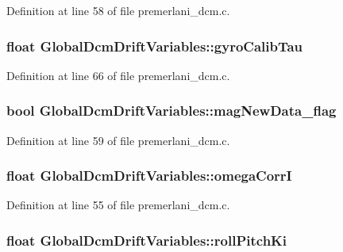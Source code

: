 \-Definition at line 58 of file premerlani\-\_\-dcm.\-c.

\hypertarget{struct_global_dcm_drift_variables_a3b2a14d2ee0eb630e1d8048391e1fdd4}{
\subsubsection[{gyro\-Calib\-Tau}]{\setlength{\rightskip}{0pt plus 5cm}float {\bf \-Global\-Dcm\-Drift\-Variables\-::gyro\-Calib\-Tau}}}\label{struct_global_dcm_drift_variables_a3b2a14d2ee0eb630e1d8048391e1fdd4}


\-Definition at line 66 of file premerlani\-\_\-dcm.\-c.

\hypertarget{struct_global_dcm_drift_variables_a225159950d82f32b3c5fe0d4014488cf}{
\subsubsection[{mag\-New\-Data\-\_\-flag}]{\setlength{\rightskip}{0pt plus 5cm}bool {\bf \-Global\-Dcm\-Drift\-Variables\-::mag\-New\-Data\-\_\-flag}}}\label{struct_global_dcm_drift_variables_a225159950d82f32b3c5fe0d4014488cf}


\-Definition at line 59 of file premerlani\-\_\-dcm.\-c.

\hypertarget{struct_global_dcm_drift_variables_a08c07c4b4d2fbc994b2eee3f0d4772b1}{
\subsubsection[{omega\-Corr\-I}]{\setlength{\rightskip}{0pt plus 5cm}float {\bf \-Global\-Dcm\-Drift\-Variables\-::omega\-Corr\-I}}}\label{struct_global_dcm_drift_variables_a08c07c4b4d2fbc994b2eee3f0d4772b1}


\-Definition at line 55 of file premerlani\-\_\-dcm.\-c.

\hypertarget{struct_global_dcm_drift_variables_a527cbde51d73c3c3fa34e5ce3b17454a}{
\subsubsection[{roll\-Pitch\-Ki}]{\setlength{\rightskip}{0pt plus 5cm}float {\bf \-Global\-Dcm\-Drift\-Variables\-::roll\-Pitch\-Ki}}}\label{struct_global_dcm_drift_variables_a527cbde51d73c3c3fa34e5ce3b17454a}


